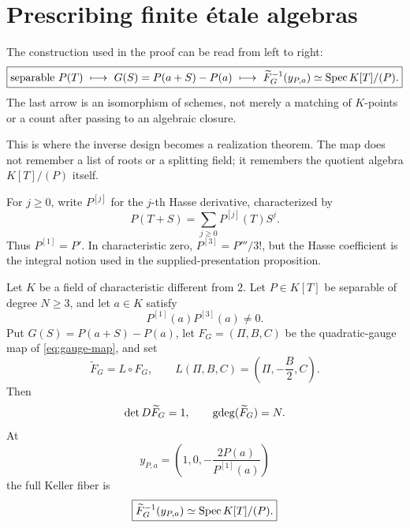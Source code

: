 \section{Prescribing finite \'etale algebras}
\label{sec:prescribing}

The construction used in the proof can be read from left to right:
\[
 \boxed{
 \text{separable }P(T)
 \ \longmapsto\
 G(S)=P(a+S)-P(a)
 \ \longmapsto\
 \widetilde F_G^{-1}(y_{P,a})\simeq\operatorname{Spec} K[T]/(P).}
\]
The last arrow is an isomorphism of schemes, not merely a matching of
\(K\)-points or a count after passing to an algebraic closure.

This is where the inverse design becomes a realization theorem.  The map
does not remember a list of roots or a splitting field; it remembers the
quotient algebra \(K[T]/(P)\) itself.

For \(j\geq0\), write \(P^{[j]}\) for the \(j\)-th Hasse derivative,
characterized by
\begin{equation}
 P(T+S)=\sum_{j\geq0}P^{[j]}(T)S^j.
 \label{eq:hasse-derivatives}
\end{equation}
Thus \(P^{[1]}=P'\).  In characteristic zero,
\(P^{[3]}=P'''/3!\), but the Hasse coefficient is the integral notion used
in the supplied-presentation proposition.

\begin{proposition}
\label{prop:supplied-polynomial-realization}
Let \(K\) be a field of characteristic different from \(2\).  Let
\(P\in K[T]\) be separable of degree \(N\geq3\), and let \(a\in K\)
satisfy
\[
 P^{[1]}(a)P^{[3]}(a)\neq0.
\]
Put \(G(S)=P(a+S)-P(a)\), let \(F_G=(\Pi,B,C)\) be the
quadratic-gauge map of \eqref{eq:gauge-map}, and set
\[
 \widetilde F_G=L\circ F_G,
 \qquad
 L(\Pi,B,C)=\left(\Pi,-\frac B2,C\right).
\]
Then
\[
 \det D\widetilde F_G=1,
 \qquad
 \operatorname{gdeg}(\widetilde F_G)=N.
\]
At
\begin{equation}
 y_{P,a}=\left(1,0,-\frac{2P(a)}{P^{[1]}(a)}\right)
 \label{eq:main-target}
\end{equation}
the full Keller fiber is
\[
 \boxed{\widetilde F_G^{-1}(y_{P,a})
 \simeq\operatorname{Spec} K[T]/(P).}
\]
\end{proposition}

